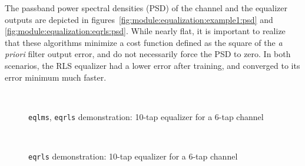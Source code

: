 The passband power spectral densities (PSD) of the channel and the equalizer outputs
are depicted in figures~\ref{fig:module:equalization:example1:psd} and \ref{fig:module:equalization:eqrls:psd}.
While nearly flat, it is important to realize that these algorithms minimize
a cost function defined as the square of the {\it a priori} filter output error,
and do not necessarily force the PSD to zero.
In both scenarios, the RLS equalizer had a lower error after training, and converged to its
error minimum much faster.



\begin{figure}[ht]
\centering
\mbox{
   \quad
   \quad
}
\mbox{
   \quad
   \quad
}
\caption{{\tt eqlms}, {\tt eqrls} demonstration:
10-tap equalizer for a 6-tap channel}
\label{fig:module:equalization:example1}
\end{figure}


\begin{figure}[ht]
\centering
\mbox{
  \subfigure[PSD] {
      \label{fig:module:equalization:eqrls:psd}
    } \quad
  \subfigure[constellation] {
      \label{fig:module:equalization:eqrls:constellation}
    } \quad
}
\mbox{
  \subfigure[taps] {
      \label{fig:module:equalization:eqrls:taps}
    } \quad
   \quad
}
\caption{{\tt eqrls} demonstration: 10-tap equalizer for a 6-tap channel}
\label{fig:module:equalization:eqrls}
\end{figure}


